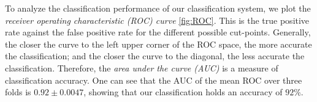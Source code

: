To analyze the classification performance of our classification system, we plot the \textit{receiver operating characteristic (ROC) curve} \ref{fig:ROC}. 
This is the true positive rate against the false positive rate for the different possible cut-points. 
Generally, the closer the curve to the left upper corner of the ROC space, the more accurate the classification; and the closer the curve to the diagonal, the less accurate the classification. 
Therefore, the \textit{area under the curve (AUC)} is a measure of classification accuracy.
One can see that the AUC of the mean ROC over three folds is $0.92 \pm 0.0047$, showing that our classification holds an accuracy of $92\%$.
